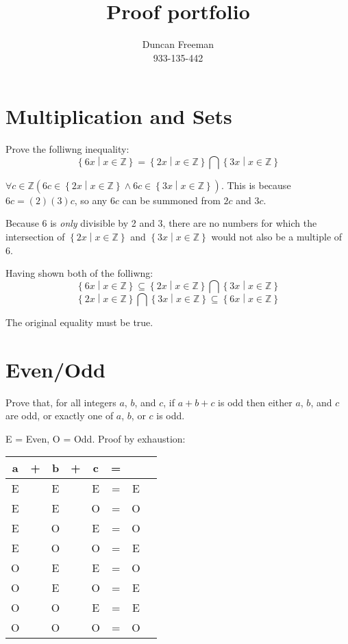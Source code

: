 \documentclass{article}
\title{ Proof portfolio }
\begin{document}
\author{
    Duncan Freeman \\ 933-135-442
}

\maketitle

\section{Multiplication and Sets}
\newcommand{\mulset}[1]{ \left\{ #1 \middle| x \in \mathbb{Z} \right\} }

Prove the folliwng inequality:
\[ \mulset{6x} = \mulset{2x} \bigcap \mulset{3x} \]

$\forall c \in \mathbb{Z} \left( 6c \in \mulset{2x} \land 6c \in \mulset{3x}\right)$. This is because $6c = (2)(3)c$, so any $6c$ can be summoned from $2c$ and $3c$.

\smallskip

Because 6 is \textit{only} divisible by 2 and 3, there are no numbers for which the intersection of $\mulset{2x}$ and $\mulset{3x}$ would not also be a multiple of 6.

\smallskip

Having shown both of the folliwng:
\[ \mulset{6x} \subseteq \mulset{2x} \bigcap \mulset{3x} \]
\[  \mulset{2x} \bigcap \mulset{3x} \subseteq \mulset{6x}  \]

The original equality must be true.

\section{Even/Odd}
Prove that, for all integers $a$, $b$, and $c$, if $a + b + c$ is odd then either $a$, $b$, and $c$ are odd, or exactly one of $a$, $b$, or $c$ is odd.

\medskip

E = Even, O = Odd. Proof by exhaustion:

\begin{center}
    \begin{tabular}{ c c c c c c c c }
        a & + & b & + & c & = && \\
        \hline
        E && E && E & = & E \\
        E && E && O & = & O \\
        E && O && E & = & O \\
        E && O && O & = & E \\
        O && E && E & = & O \\
        O && E && O & = & E \\
        O && O && E & = & E \\
        O && O && O & = & O \\
    \end{tabular}
\end{center}
\end{document}
